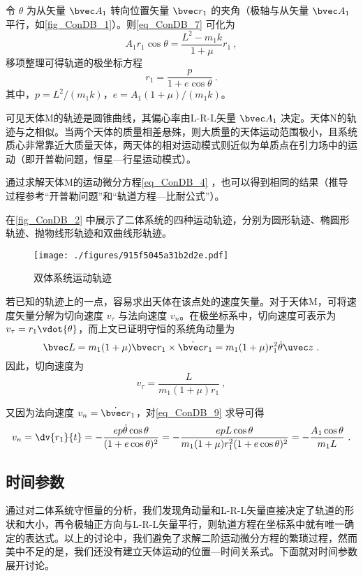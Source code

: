 令 $\theta$ 为从矢量 $\bvec A_1$ 转向位置矢量 $\bvec r_1$ 的夹角（极轴与从矢量 $\bvec A_1$ 平行，如\autoref{fig_ConDB_1}）。则\autoref{eq_ConDB_7} 可化为
\begin{equation}
A_1r_1\cos\theta = \frac{L^2-m_1k}{1+\mu}r_1~,
\end{equation}
移项整理可得轨道的极坐标方程
\begin{equation}\label{eq_ConDB_9}
r_1=\frac{p}{1+e \cos\theta}~.
\end{equation}
其中，$p=L^2/(m_1k)$，$e=A_1(1+\mu)/(m_1k)$。

可见天体M的轨迹是圆锥曲线，其偏心率由L-R-L矢量 $\bvec A_1$ 决定。天体N的轨迹与之相似。当两个天体的质量相差悬殊，则大质量的天体运动范围极小，且系统质心非常靠近大质量天体，两天体的相对运动模式则近似为单质点在引力场中的运动（即开普勒问题，恒星—行星运动模式）。

通过求解天体M的运动微分方程\autoref{eq_ConDB_4} ，也可以得到相同的结果（推导过程参考“开普勒问题”和“轨道方程—比耐公式”）。

在\autoref{fig_ConDB_2} 中展示了二体系统的四种运动轨迹，分别为圆形轨迹、椭圆形轨迹、抛物线形轨迹和双曲线形轨迹。
\begin{figure}[ht]
\centering
\texttt{[image: ./figures/915f5045a31b2d2e.pdf]}
\caption{双体系统运动轨迹} \label{fig_ConDB_2}
\end{figure}

若已知的轨迹上的一点，容易求出天体在该点处的速度矢量。对于天体M，可将速度矢量分解为切向速度 $v_\tau$ 与法向速度 $v_n$。在极坐标系中，切向速度可表示为 $v_\tau =r_1\vdot{\theta}$，而上文已证明守恒的系统角动量为
\begin{equation}\label{eq_ConDB_10}
\bvec L  = m_1(1+\mu)\bvec r_1 \times \dot{\bvec r}_1= m_1(1+\mu)r_1^2\dot{\theta}\uvec z~.
\end{equation}
因此，切向速度为
\begin{equation}
v_\tau =\frac{L}{m_1(1+\mu)r_1}~,
\end{equation}

又因为法向速度 $v_n=\dot{\bvec r}_1$，对\autoref{eq_ConDB_9} 求导可得
\begin{equation}
v_n =\dv{r_1}{t}=-\frac{ep\dot{\theta}\cos\theta}{(1+e\cos\theta)^2}=-\frac{epL\cos\theta}{m_1(1+\mu)r_1^2(1+e\cos\theta)^2}=-\frac{A_1\cos\theta}{m_1L}~.
\end{equation}

\subsection{时间参数}
通过对二体系统守恒量的分析，我们发现角动量和L-R-L矢量直接决定了轨道的形状和大小，再令极轴正方向与L-R-L矢量平行，则轨道方程在坐标系中就有唯一确定的表达式。以上的讨论中，我们避免了求解二阶运动微分方程的繁琐过程，然而美中不足的是，我们还没有建立天体运动的位置—时间关系式。下面就对时间参数展开讨论。

